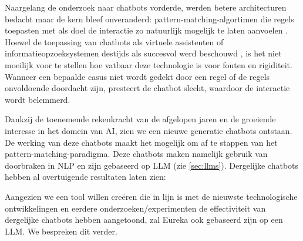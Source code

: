 Naargelang de onderzoek naar chatbots vorderde, werden betere architecturen bedacht maar de kern bleef onveranderd: pattern-matching-algortimen die regels toepasten met als doel de interactie zo natuurlijk mogelijk te laten aanvoelen \autocite{AbuShawar2007}. Hoewel de toepassing van chatbots als virtuele assistenten of informatieopzoeksystemen destijds als succesvol werd beschouwd \autocite{AbuShawar2007}, is het niet moeilijk voor te stellen hoe vatbaar deze technologie is voor fouten en rigiditeit. Wanneer een bepaalde casus niet wordt gedekt door een regel of de regels onvoldoende doordacht zijn, presteert de chatbot slecht, waardoor de interactie wordt belemmerd. 

Dankzij de toenemende rekenkracht van de afgelopen jaren en de groeiende interesse in het domein van \acrlong{AI}, zien we een nieuwe generatie chatbots ontstaan. De werking van deze chatbots maakt het mogelijk om af te stappen van het pattern-matching-paradigma. Deze chatbots maken namelijk gebruik van doorbraken in \acrfull{NLP} en zijn gebaseerd op \acrfull{LLM} (zie \ref{sec:llms}). Dergelijke chatbots hebben al overtuigende resultaten laten zien:


Aangezien we een tool willen creëren die in lijn is met de nieuwste technologische ontwikkelingen en eerdere onderzoeken/experimenten de effectiviteit van dergelijke chatbots hebben aangetoond, zal Eureka ook gebaseerd zijn op een \acrshort{LLM}. We bespreken dit verder.

